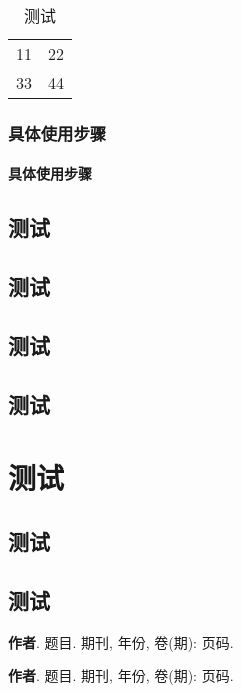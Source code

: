 \documentclass[library = {math.master}]{whuthesis}
\begin{document}
\begin{table}[htbp]
  \centering
  \caption{测试}
  \label{table:test}
  \begin{tabular}{|c|c|}
    11 & 22 \\
    33 & 44 
  \end{tabular}
\end{table}


\subsection{具体使用步骤}
\subsubsection{具体使用步骤}
\section{测试}
\section{测试}
\section{测试}
\zhlipsum[1-4]
\section{测试}
\zhlipsum[1-4]


\chapter{测试}
\zhlipsum[1-4]
\section{测试}
\zhlipsum[1-4]
\section{测试}
\zhlipsum[1-4]
\nocite{*}



\printbibliography

\backmatter
\begin{publications}
  \item \textbf{作者}. 题目. 期刊, 年份, 卷(期): 页码.
  \item \textbf{作者}. 题目. 期刊, 年份, 卷(期): 页码.
\end{publications}

\begin{acknowledgement}
  \zhlipsum[1-4]
\end{acknowledgement}
\end{document}

